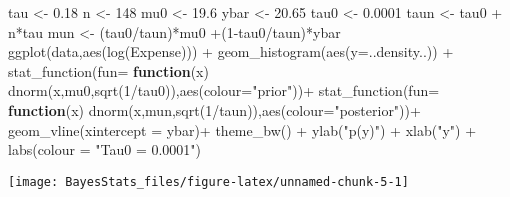 \documentclass[
]{book}
\newenvironment{Shaded}{\begin{snugshade}}{\end{snugshade}}
\newcommand{\AttributeTok}[1]{\textcolor[rgb]{0.77,0.63,0.00}{#1}}
\newcommand{\ControlFlowTok}[1]{\textcolor[rgb]{0.13,0.29,0.53}{\textbf{#1}}}
\newcommand{\DecValTok}[1]{\textcolor[rgb]{0.00,0.00,0.81}{#1}}
\newcommand{\FloatTok}[1]{\textcolor[rgb]{0.00,0.00,0.81}{#1}}
\newcommand{\FunctionTok}[1]{\textcolor[rgb]{0.00,0.00,0.00}{#1}}
\newcommand{\NormalTok}[1]{#1}
\newcommand{\OtherTok}[1]{\textcolor[rgb]{0.56,0.35,0.01}{#1}}
\newcommand{\SpecialCharTok}[1]{\textcolor[rgb]{0.00,0.00,0.00}{#1}}
\newcommand{\StringTok}[1]{\textcolor[rgb]{0.31,0.60,0.02}{#1}}
\begin{document}
\begin{Shaded}
\begin{Highlighting}[]
\NormalTok{tau }\OtherTok{\textless{}{-}} \FloatTok{0.18}
\NormalTok{n }\OtherTok{\textless{}{-}} \DecValTok{148}
\NormalTok{mu0 }\OtherTok{\textless{}{-}} \FloatTok{19.6}
\NormalTok{ybar }\OtherTok{\textless{}{-}} \FloatTok{20.65}
\NormalTok{tau0 }\OtherTok{\textless{}{-}} \FloatTok{0.0001}
\NormalTok{taun }\OtherTok{\textless{}{-}}\NormalTok{ tau0 }\SpecialCharTok{+}\NormalTok{ n}\SpecialCharTok{*}\NormalTok{tau}
\NormalTok{mun }\OtherTok{\textless{}{-}}\NormalTok{ (tau0}\SpecialCharTok{/}\NormalTok{taun)}\SpecialCharTok{*}\NormalTok{mu0 }\SpecialCharTok{+}\NormalTok{(}\DecValTok{1}\SpecialCharTok{{-}}\NormalTok{tau0}\SpecialCharTok{/}\NormalTok{taun)}\SpecialCharTok{*}\NormalTok{ybar}
\FunctionTok{ggplot}\NormalTok{(data,}\FunctionTok{aes}\NormalTok{(}\FunctionTok{log}\NormalTok{(Expense))) }\SpecialCharTok{+}
  \FunctionTok{geom\_histogram}\NormalTok{(}\FunctionTok{aes}\NormalTok{(}\AttributeTok{y=}\NormalTok{..density..)) }\SpecialCharTok{+}
  \FunctionTok{stat\_function}\NormalTok{(}\AttributeTok{fun=} \ControlFlowTok{function}\NormalTok{(x) }\FunctionTok{dnorm}\NormalTok{(x,mu0,}\FunctionTok{sqrt}\NormalTok{(}\DecValTok{1}\SpecialCharTok{/}\NormalTok{tau0)),}\FunctionTok{aes}\NormalTok{(}\AttributeTok{colour=}\StringTok{"prior"}\NormalTok{))}\SpecialCharTok{+}
  \FunctionTok{stat\_function}\NormalTok{(}\AttributeTok{fun=} \ControlFlowTok{function}\NormalTok{(x) }\FunctionTok{dnorm}\NormalTok{(x,mun,}\FunctionTok{sqrt}\NormalTok{(}\DecValTok{1}\SpecialCharTok{/}\NormalTok{taun)),}\FunctionTok{aes}\NormalTok{(}\AttributeTok{colour=}\StringTok{"posterior"}\NormalTok{))}\SpecialCharTok{+}
  \FunctionTok{geom\_vline}\NormalTok{(}\AttributeTok{xintercept =}\NormalTok{ ybar)}\SpecialCharTok{+}
  \FunctionTok{theme\_bw}\NormalTok{() }\SpecialCharTok{+} \FunctionTok{ylab}\NormalTok{(}\StringTok{"p(y)"}\NormalTok{) }\SpecialCharTok{+} \FunctionTok{xlab}\NormalTok{(}\StringTok{"y"}\NormalTok{) }\SpecialCharTok{+} \FunctionTok{labs}\NormalTok{(}\AttributeTok{colour =} \StringTok{"Tau0  = 0.0001"}\NormalTok{)}
\end{Highlighting}
\end{Shaded}

\begin{center}\texttt{[image: BayesStats\_files/figure-latex/unnamed-chunk-5-1]} \end{center}
\end{document}
